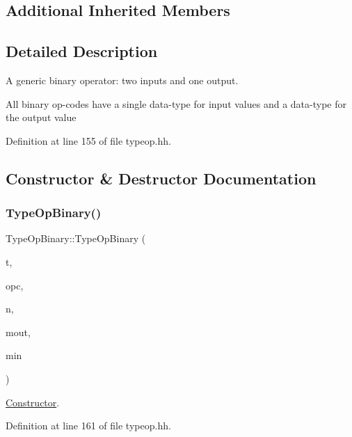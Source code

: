 \subsection*{Additional Inherited Members}


\subsection{Detailed Description}
A generic binary operator\+: two inputs and one output. 

All binary op-\/codes have a single data-\/type for input values and a data-\/type for the output value 

Definition at line 155 of file typeop.\+hh.



\subsection{Constructor \& Destructor Documentation}
\mbox{\label{class_type_op_binary_a4009e7dc1b773c67e405e9ac66fe8fad}} 
\subsubsection{\texorpdfstring{TypeOpBinary()}{TypeOpBinary()}}
{\footnotesize\ttfamily Type\+Op\+Binary\+::\+Type\+Op\+Binary (\begin{DoxyParamCaption}\item[{\mbox{\hyperlink{class_type_factory}{Type\+Factory}} $\ast$}]{t,  }\item[{\mbox{\hyperlink{opcodes_8hh_abeb7dfb0e9e2b3114e240a405d046ea7}{Op\+Code}}}]{opc,  }\item[{const string \&}]{n,  }\item[{\mbox{\hyperlink{type_8hh_aef6429f2523cdf4d415ba04a0209e61f}{type\+\_\+metatype}}}]{mout,  }\item[{\mbox{\hyperlink{type_8hh_aef6429f2523cdf4d415ba04a0209e61f}{type\+\_\+metatype}}}]{min }\end{DoxyParamCaption})\hspace{0.3cm}{\ttfamily [inline]}}



\mbox{\hyperlink{class_constructor}{Constructor}}. 



Definition at line 161 of file typeop.\+hh.




